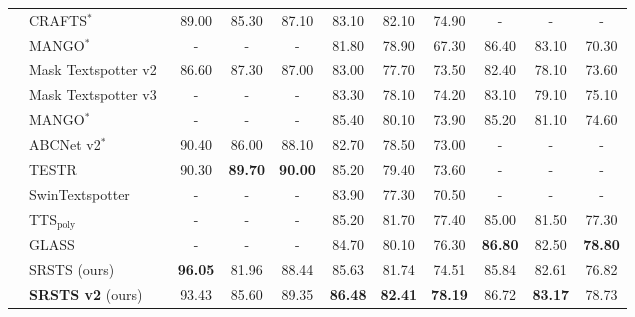 \begin{table*}[t]
\begin{tabular}{l|l|ccccccccc}
     &CRAFTS$^{*}$~\cite{baek2020character}  &89.00  & 85.30& 87.10&  83.10 & 82.10 &74.90 &- &- & - \\
     &MANGO$^{*}$~\cite{qiao2020mango} & -&  - & - & 81.80 &78.90&  67.30 & 86.40 & 83.10&  70.30  \\
     \midrule
     &Mask Textspotter v2~\cite{liao2019mask}  & 86.60& 87.30& 87.00& 83.00& 77.70& 73.50& 82.40& 78.10& 73.60\\
     &Mask Textspotter v3~\cite{liao2020mask}  & -& -& -& 83.30& 78.10& 74.20&83.10&79.10& 75.10\\
     &MANGO$^{*}$~\cite{qiao2020mango} &-& -& -& 85.40& 80.10& 73.90&85.20&81.10& 74.60\\ 
     &ABCNet v2$^{*}$~\cite{liu2021abcnet} & 90.40&86.00& 88.10& 82.70& 78.50& 73.00&-&-& -\\
     &TESTR~\cite{zhang2022text} & 90.30 & \textbf{89.70} & \textbf{90.00} & 85.20 & 79.40& 73.60 &- & - & -\\
     &SwinTextspotter~\cite{huang2022swintextspotter}&-& -& -& 83.90 &77.30  &70.50&-& -& - \\
     &TTS${}_{\text{poly}}$~\cite{kittenplon2022towards}  &- &- & -& 85.20 &81.70 &77.40 &85.00 &81.50& 77.30\\ &GLASS~\cite{ronen2022glass}&-&- &- & 84.70& 80.10 & 76.30&\textbf{86.80}& 82.50& \textbf{78.80}\\
     &SRSTS (ours)~\cite{wu2022decoupling}  &\textbf{96.05}& 81.96 &  88.44 & 85.63 & 81.74 &  74.51&  85.84 & 82.61 & 76.82\\ 
&\textbf{SRSTS v2} (ours) &93.43 &85.60 & 89.35& \textbf{86.48}&\textbf{82.41} &\textbf{78.19} &86.72 &\textbf{83.17} &78.73\\
\bottomrule
  \end{tabular}
\end{table*} 
 

